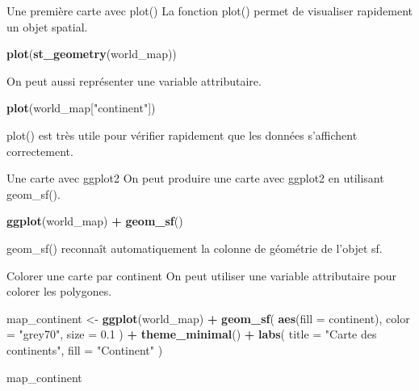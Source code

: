 \documentclass[
  10pt,
  ignorenonframetext,
]{beamer}
\newenvironment{Shaded}{\begin{snugshade}}{\end{snugshade}}
\newcommand{\AttributeTok}[1]{\textcolor[rgb]{0.13,0.29,0.53}{#1}}
\newcommand{\FloatTok}[1]{\textcolor[rgb]{0.00,0.00,0.81}{#1}}
\newcommand{\FunctionTok}[1]{\textcolor[rgb]{0.13,0.29,0.53}{\textbf{#1}}}
\newcommand{\NormalTok}[1]{#1}
\newcommand{\OtherTok}[1]{\textcolor[rgb]{0.56,0.35,0.01}{#1}}
\newcommand{\SpecialCharTok}[1]{\textcolor[rgb]{0.81,0.36,0.00}{\textbf{#1}}}
\newcommand{\StringTok}[1]{\textcolor[rgb]{0.31,0.60,0.02}{#1}}
\begin{document}
\begin{frame}[fragile]{Une première carte avec plot()}
\label{une-premiuxe8re-carte-avec-plot}
La fonction plot() permet de visualiser rapidement un objet spatial.

\begin{Shaded}
\begin{Highlighting}[]
\FunctionTok{plot}\NormalTok{(}\FunctionTok{st\_geometry}\NormalTok{(world\_map))}
\end{Highlighting}
\end{Shaded}

On peut aussi représenter une variable attributaire.

\begin{Shaded}
\begin{Highlighting}[]
\FunctionTok{plot}\NormalTok{(world\_map[}\StringTok{"continent"}\NormalTok{])}
\end{Highlighting}
\end{Shaded}

plot() est très utile pour vérifier rapidement que les données
s'affichent correctement.
\end{frame}

\begin{frame}[fragile]{Une carte avec ggplot2}
\label{une-carte-avec-ggplot2}
On peut produire une carte avec ggplot2 en utilisant geom\_sf().

\begin{Shaded}
\begin{Highlighting}[]
\FunctionTok{ggplot}\NormalTok{(world\_map) }\SpecialCharTok{+}
  \FunctionTok{geom\_sf}\NormalTok{()}
\end{Highlighting}
\end{Shaded}

geom\_sf() reconnaît automatiquement la colonne de géométrie de l'objet
sf.
\end{frame}

\begin{frame}[fragile]{Colorer une carte par continent}
\label{colorer-une-carte-par-continent}
On peut utiliser une variable attributaire pour colorer les polygones.

\begin{Shaded}
\begin{Highlighting}[]
\NormalTok{map\_continent }\OtherTok{\textless{}{-}} \FunctionTok{ggplot}\NormalTok{(world\_map) }\SpecialCharTok{+}
  \FunctionTok{geom\_sf}\NormalTok{(}
    \FunctionTok{aes}\NormalTok{(}\AttributeTok{fill =}\NormalTok{ continent),}
    \AttributeTok{color =} \StringTok{"grey70"}\NormalTok{,}
    \AttributeTok{size =} \FloatTok{0.1}
\NormalTok{  ) }\SpecialCharTok{+}
  \FunctionTok{theme\_minimal}\NormalTok{() }\SpecialCharTok{+}
  \FunctionTok{labs}\NormalTok{(}
    \AttributeTok{title =} \StringTok{"Carte des continents"}\NormalTok{,}
    \AttributeTok{fill =} \StringTok{"Continent"}
\NormalTok{  )}

\NormalTok{map\_continent}
\end{Highlighting}
\end{Shaded}
\end{frame}
\end{document}
